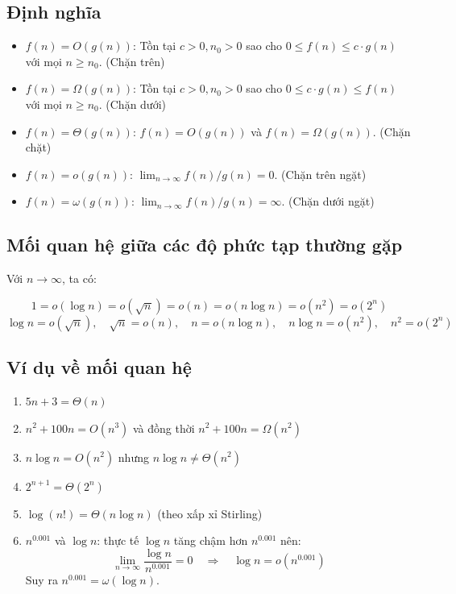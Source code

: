 \documentclass[12pt,a4paper]{article}
\begin{document}
\subsection*{Định nghĩa}
\begin{itemize}
    \item $f(n) = O(g(n))$: Tồn tại $c > 0, n_0 > 0$ sao cho $0 \le f(n) \le c\cdot g(n)$ với mọi $n \ge n_0$. (Chặn trên)
    \item $f(n) = \Omega(g(n))$: Tồn tại $c > 0, n_0 > 0$ sao cho $0 \le c\cdot g(n) \le f(n)$ với mọi $n \ge n_0$. (Chặn dưới)
    \item $f(n) = \Theta(g(n))$: $f(n) = O(g(n))$ và $f(n) = \Omega(g(n))$. (Chặn chặt)
    \item $f(n) = o(g(n))$: $\lim_{n \to \infty} f(n)/g(n) = 0$. (Chặn trên ngặt)
    \item $f(n) = \omega(g(n))$: $\lim_{n \to \infty} f(n)/g(n) = \infty$. (Chặn dưới ngặt)
\end{itemize}

\subsection*{Mối quan hệ giữa các độ phức tạp thường gặp}
Với $n \to \infty$, ta có:

\[
1 = o(\log n) = o(\sqrt{n}) = o(n) = o(n\log n) = o(n^2) = o(2^n)
\]
\[
\log n = o(\sqrt{n}), \quad \sqrt{n} = o(n), \quad n = o(n\log n), \quad n\log n = o(n^2), \quad n^2 = o(2^n)
\]

\subsection*{Ví dụ về mối quan hệ}
\begin{enumerate}[label=\arabic*.]
    \item $5n + 3 = \Theta(n)$
    \item $n^2 + 100n = O(n^3)$ và đồng thời $n^2 + 100n = \Omega(n^2)$
    \item $n\log n = O(n^2)$ nhưng $n\log n \neq \Theta(n^2)$
    \item $2^{n+1} = \Theta(2^n)$
    \item $\log(n!) = \Theta(n\log n)$ (theo xấp xỉ Stirling)
    \item $n^{0.001}$ và $\log n$: thực tế $\log n$ tăng chậm hơn $n^{0.001}$ nên:
    \[
    \lim_{n\to\infty} \frac{\log n}{n^{0.001}} = 0 \quad \Rightarrow \quad \log n = o(n^{0.001})
    \]
    Suy ra $n^{0.001} = \omega(\log n)$.
\end{enumerate}
\end{document}
